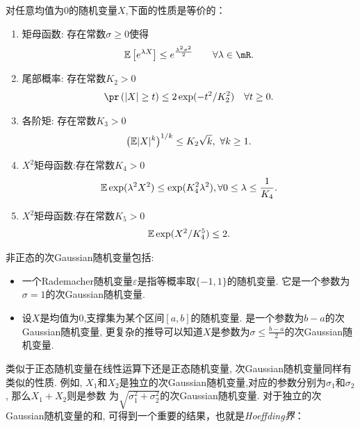 \begin{defin}[次Gaussian随机变量定义的等价性]
  对任意均值为0的随机变量$X$,下面的性质是等价的：
		\begin{enumerate}
		  \item 矩母函数: 存在常数$\sigma\geq 0$使得
		  \begin{align*}
			\E\left[e^{\lambda X}\right] \leq e^{\frac{\lambda^{2} \sigma^{2}}{2}} \qquad \forall \lambda \in \mR.
		  \end{align*}
		  \item 尾部概率: 存在常数$K_2>0$
		  \begin{align*}
			\pr\left( |X| \geq t \right) \leq 2 \exp(-t^2/K_2^2) \quad \forall t \geq 0.
		  \end{align*}
		  \item 各阶矩: 存在常数$K_3>0$
		  \begin{align*}
			\left( \mathbb{E} |X|^k  \right)^{1/k} \leq K_2 \sqrt{k},~\forall k \geq 1.
		  \end{align*}
		  \item $X^2$矩母函数:存在常数$K_4>0$
		  \begin{align*}
			\mathbb{E} \exp(\lambda^2 X^2) \leq \exp(K_4^2 \lambda^2),\forall 0 \leq \lambda \leq \frac{1}{K_4}.
		\end{align*}
		  \item $X^2$矩母函数:存在常数$K_5>0$
		  \begin{align*}
			\mathbb{E} \exp(X^2/K^5_4) \leq 2.
		\end{align*}
		\end{enumerate}
	\end{defin}

非正态的次Gaussian随机变量包括:
\begin{itemize}
	\item  一个Rademacher随机变量$\varepsilon$是指等概率取$\{-1,1\}$的随机变量. 它是一个参数为$\sigma=1$的次Gaussian随机变量.
	\item 设$X$是均值为0,支撑集为某个区间$[a,b]$的随机变量. 是一个参数为$b-a$的次Gaussian随机变量, 更复杂的推导可以知道$X$是参数为$\sigma\leq \frac{b-a}{2}$的次Gaussian随机变量.
\end{itemize}
  
类似于正态随机变量在线性运算下还是正态随机变量, 次Gaussian随机变量同样有类似的性质. 例如, $X_{1}$和$X_{2}$是独立的次Gaussian随机变量,对应的参数分别为$\sigma_{1}$和$\sigma_{2}$, 那么$X_{1}+X_{2}$则是参数
为$\sqrt{\sigma_{1}^{2}+\sigma_{2}^{2}}$的次Gaussian随机变量. 对于独立的次Gaussian随机变量的和, 可得到一个重要的结果，也就是\emph{Hoeffding界}：

